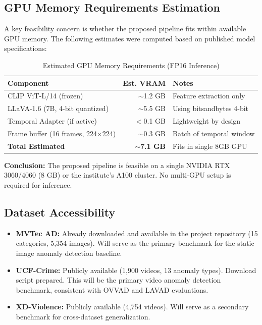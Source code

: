 \documentclass[12pt, a4paper]{article}
\begin{document}
\subsection{GPU Memory Requirements Estimation}

A key feasibility concern is whether the proposed pipeline fits within available GPU memory. The following estimates were computed based on published model specifications:

\begin{table}[h!]
\centering
\caption{Estimated GPU Memory Requirements (FP16 Inference)}
\label{tab:gpu}
\renewcommand{\arraystretch}{1.2}
\begin{tabular}{@{} l r l @{}}
\toprule
\textbf{Component} & \textbf{Est. VRAM} & \textbf{Notes} \\
\midrule
CLIP ViT-L/14 (frozen) & $\sim$1.2 GB & Feature extraction only \\
LLaVA-1.6 (7B, 4-bit quantized) & $\sim$5.5 GB & Using bitsandbytes 4-bit \\
Temporal Adapter (if active) & $<$0.1 GB & Lightweight by design \\
Frame buffer (16 frames, 224$\times$224) & $\sim$0.3 GB & Batch of temporal window \\
\midrule
\textbf{Total Estimated} & $\sim$\textbf{7.1 GB} & Fits in single 8GB GPU \\
\bottomrule
\end{tabular}
\end{table}

\textbf{Conclusion:} The proposed pipeline is feasible on a single NVIDIA RTX 3060/4060 (8 GB) or the institute's A100 cluster. No multi-GPU setup is required for inference.

\subsection{Dataset Accessibility}

\begin{itemize}[leftmargin=*]
    \item \textbf{MVTec AD:} Already downloaded and available in the project repository (15 categories, 5,354 images). Will serve as the primary benchmark for the static image anomaly detection baseline.
    \item \textbf{UCF-Crime:} Publicly available (1,900 videos, 13 anomaly types). Download script prepared. This will be the primary video anomaly detection benchmark, consistent with OVVAD and LAVAD evaluations.
    \item \textbf{XD-Violence:} Publicly available (4,754 videos). Will serve as a secondary benchmark for cross-dataset generalization.
\end{itemize}
\end{document}
